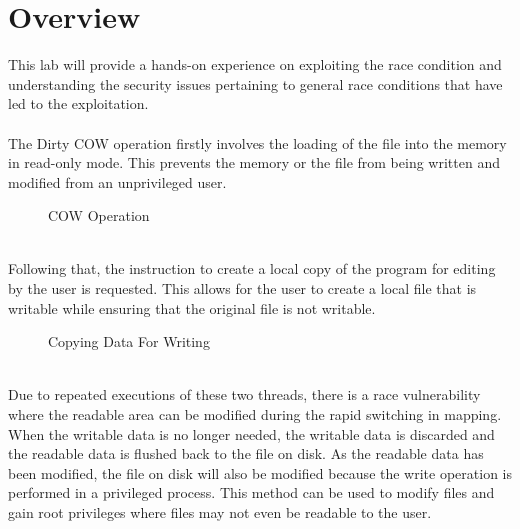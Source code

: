 \documentclass[a4paper,12pt]{article}
\begin{document}
\section{Overview}
This lab will provide a hands-on experience on exploiting the race condition and understanding the security issues pertaining to general race conditions that have led to the exploitation.
\\\\
The Dirty COW operation firstly involves the loading of the file into the memory in read-only mode. This prevents the memory or the file from being written and modified from an unprivileged user.
\begin{figure}[!h]
\centering
{}
\caption{COW Operation}
\end{figure}\\
Following that, the instruction to create a local copy of the program for editing by the user is requested. This allows for the user to create a local file that is writable while ensuring that the original file is not writable.
\begin{figure}[!h]
\centering
{}
\caption{Copying Data For Writing}
\end{figure}
\\Due to repeated executions of these two threads, there is a race vulnerability where the readable area can be modified during the rapid switching in mapping. When the writable data is no longer needed, the writable data is discarded and the readable data is flushed back to the file on disk. As the readable data has been modified, the file on disk will also be modified because the write operation is performed in a privileged process. This method can be used to modify files and gain root privileges where files may not even be readable to the user.
\end{document}
